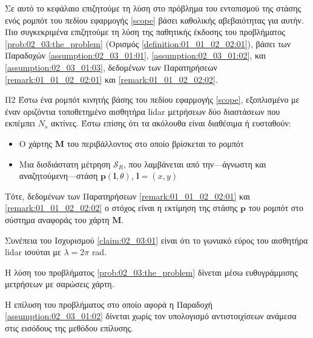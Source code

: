 Σε αυτό το κεφάλαιο επιζητούμε τη λύση στο πρόβλημα του εντοπισμού της στάσης
ενός ρομπότ του πεδίου εφαρμογής \ref{scope} βάσει καθολικής αβεβαιότητας για
αυτήν. Πιο συγκεκριμένα επιζητούμε τη λύση της παθητικής έκδοσης του προβλήματος
\ref{prob:02_03:the_problem} (Ορισμός \ref{definition:01_01_02_02:01}), βάσει
των Παραδοχών \ref{assumption:02_03_01:01}, \ref{assumption:02_03_01:02}, και
\ref{assumption:02_03_01:03}, δεδομένων των Παρατηρήσεων
\ref{remark:01_01_02_02:01} και \ref{remark:01_01_02_02:02}.

\begin{bw_box}
\begin{customproblem}{Π2}
  \label{prob:02_03:the_problem}
  Έστω ένα ρομπότ κινητής βάσης του πεδίου εφαρμογής \ref{scope}, εξοπλισμένο με
  έναν οριζόντια τοποθετημένο αισθητήρα lidar μετρήσεων δύο διαστάσεων που
  εκπέμπει $N_s$ ακτίνες. Έστω επίσης ότι τα ακόλουθα είναι διαθέσιμα ή
  ευσταθούν:
  \begin{itemize}
    \item Ο χάρτης $\bm{M}$ του περιβάλλοντος στο οποίο βρίσκεται το ρομπότ
    \item Μια δισδιάστατη μέτρηση $\mathcal{S}_R$, που λαμβάνεται από
          την---άγνωστη και αναζητούμενη---στάση $\bm{p}(\bm{l},\theta)$,
          $\bm{l} = (x,y)$
  \end{itemize}
\end{customproblem}
Τότε, δεδομένων των Παρατηρήσεων \ref{remark:01_01_02_02:01} και
\ref{remark:01_01_02_02:02} ο στόχος είναι η εκτίμηση της στάσης $\bm{p}$ του
ρομπότ στο σύστημα αναφοράς του χάρτη $\bm{M}$.
\end{bw_box}

\begin{bw_box}
  \begin{assumption}
    \label{assumption:02_03_01:01}
    Συνέπεια του Ισχυρισμού \ref{claim:02_03:01} είναι ότι το γωνιακό εύρος του
    αισθητήρα lidar ισούται με $\lambda = 2\pi$ rad.
  \end{assumption}
\end{bw_box}

\begin{bw_box}
  \begin{assumption}
    \label{assumption:02_03_01:02}
    Η λύση του προβλήματος \ref{prob:02_03:the_problem} δίνεται μέσω
    ευθυγράμμισης μετρήσεων με σαρώσεις χάρτη.
  \end{assumption}
\end{bw_box}

\begin{bw_box}
  \begin{assumption}
    \label{assumption:02_03_01:03}
    Η επίλυση του προβλήματος στο οποίο αφορά η Παραδοχή
    \ref{assumption:02_03_01:02} δίνεται χωρίς τον υπολογισμό αντιστοιχίσεων
    ανάμεσα στις εισόδους της μεθόδου επίλυσης.
  \end{assumption}
\end{bw_box}

